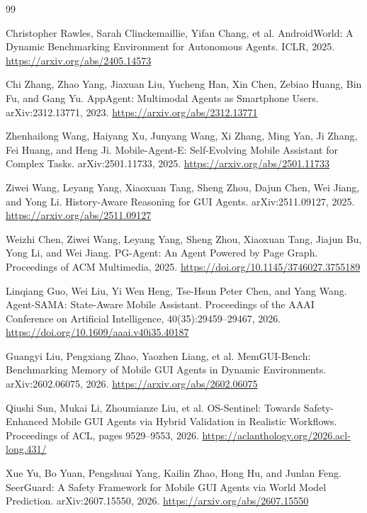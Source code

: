 \documentclass[12pt,a4paper]{ctexart}
\begin{document}
\begingroup
\small
\begin{thebibliography}{99}
\setlength{\itemsep}{0.45em}

Christopher Rawles, Sarah Clinckemaillie, Yifan Chang, et al.
AndroidWorld: A Dynamic Benchmarking Environment for Autonomous Agents.
ICLR, 2025.
\url{https://arxiv.org/abs/2405.14573}

Chi Zhang, Zhao Yang, Jiaxuan Liu, Yucheng Han, Xin Chen, Zebiao Huang, Bin Fu, and Gang Yu.
AppAgent: Multimodal Agents as Smartphone Users.
arXiv:2312.13771, 2023.
\url{https://arxiv.org/abs/2312.13771}

Zhenhailong Wang, Haiyang Xu, Junyang Wang, Xi Zhang, Ming Yan, Ji Zhang, Fei Huang, and Heng Ji.
Mobile-Agent-E: Self-Evolving Mobile Assistant for Complex Tasks.
arXiv:2501.11733, 2025.
\url{https://arxiv.org/abs/2501.11733}

Ziwei Wang, Leyang Yang, Xiaoxuan Tang, Sheng Zhou, Dajun Chen, Wei Jiang, and Yong Li.
History-Aware Reasoning for GUI Agents.
arXiv:2511.09127, 2025.
\url{https://arxiv.org/abs/2511.09127}

Weizhi Chen, Ziwei Wang, Leyang Yang, Sheng Zhou, Xiaoxuan Tang, Jiajun Bu, Yong Li, and Wei Jiang.
PG-Agent: An Agent Powered by Page Graph.
Proceedings of ACM Multimedia, 2025.
\url{https://doi.org/10.1145/3746027.3755189}

Linqiang Guo, Wei Liu, Yi Wen Heng, Tse-Hsun Peter Chen, and Yang Wang.
Agent-SAMA: State-Aware Mobile Assistant.
Proceedings of the AAAI Conference on Artificial Intelligence, 40(35):29459--29467, 2026.
\url{https://doi.org/10.1609/aaai.v40i35.40187}

Guangyi Liu, Pengxiang Zhao, Yaozhen Liang, et al.
MemGUI-Bench: Benchmarking Memory of Mobile GUI Agents in Dynamic Environments.
arXiv:2602.06075, 2026.
\url{https://arxiv.org/abs/2602.06075}

Qiushi Sun, Mukai Li, Zhoumianze Liu, et al.
OS-Sentinel: Towards Safety-Enhanced Mobile GUI Agents via Hybrid Validation in Realistic Workflows.
Proceedings of ACL, pages 9529--9553, 2026.
\url{https://aclanthology.org/2026.acl-long.431/}

Xue Yu, Bo Yuan, Pengshuai Yang, Kailin Zhao, Hong Hu, and Junlan Feng.
SeerGuard: A Safety Framework for Mobile GUI Agents via World Model Prediction.
arXiv:2607.15550, 2026.
\url{https://arxiv.org/abs/2607.15550}


\end{thebibliography}
\end{document}
